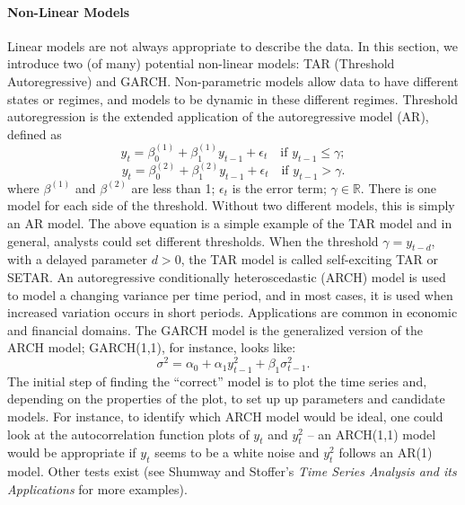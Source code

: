 \paragraph{Non-Linear Models}
Linear models are not always appropriate to describe the data. In this section, we introduce two (of many) potential non-linear models: TAR (Threshold Autoregressive) and GARCH.
Non-parametric models allow data to have different states or regimes, and models to be dynamic in these different regimes. 
\newl Threshold autoregression is the extended application of the autoregressive model (AR), defined as 
\begin{equation*}
y_t = \beta^{(1)}_0 + \beta^{(1)}_1y_{t-1}+ \epsilon_t\quad \text{if }y_{t-1} \leqslant \gamma; 
\end{equation*}
\begin{equation*} 
y_t = \beta^{(2)}_0 + \beta^{(2)}_1y_{t-1}+ \epsilon_t\quad \text{if }y_{t-1} > \gamma.
\end{equation*}
where $\beta^{(1)}$ and $\beta^{(2)}$ are less than 1; $\epsilon_t$ is the error term; $\gamma \in \mathbb{R} $. There is one model for
each side of the threshold. Without two different models, this is simply an AR model.
The above equation is a simple example of the TAR model and in general, analysts could set different thresholds. When the threshold $ \gamma = y_{t-d} $, with a delayed parameter $d>0$, the TAR model is called self-exciting TAR or SETAR. 
\newl An autoregressive conditionally heteroscedastic (ARCH) model is used to model a changing variance per time period, and in most cases, it is used when increased variation occurs in short periods. Applications are common in economic and financial domains. The GARCH model is the generalized version of the ARCH model; GARCH(1,1), for instance, looks like:
\begin{equation*}
    \sigma^2 = \alpha_0 + \alpha_1 y^2_{t-1} + \beta_1 \sigma^2_{t-1}.
\end{equation*}
The initial step of finding the ``correct'' model is to plot the time series and, depending on the properties of the plot, to set up up parameters and candidate models. For instance, to identify which ARCH model would be ideal, one could look at the autocorrelation function plots of $y_t$ and $y^2_t$ -- an ARCH(1,1) model would be appropriate if $y_t$ seems to be a white noise and $y^2_t$ follows an AR(1) model. Other tests exist (see Shumway and Stoffer's \textit{Time Series Analysis and its Applications} for more examples). 

